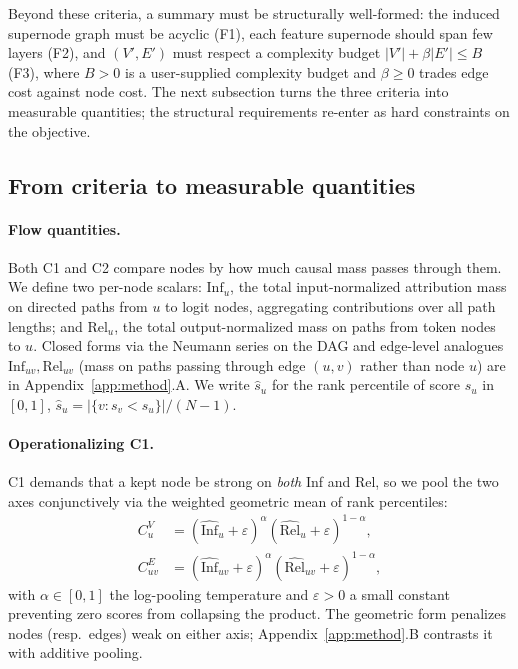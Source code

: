 \documentclass[table, 11pt]{article}
\begin{document}
Beyond these criteria, a summary must be structurally well-formed:
the induced supernode graph must be acyclic (F1), each feature
supernode should span few layers (F2), and $(V', E')$ must respect a
complexity budget $|V'| + \beta|E'| \le B$ (F3), where $B > 0$ is a
user-supplied complexity budget and $\beta \ge 0$ trades edge cost
against node cost. The next subsection turns the three criteria into
measurable quantities; the structural requirements re-enter as hard
constraints on the objective.

\subsection{From criteria to measurable quantities}\label{sec:operationalize}

\paragraph{Flow quantities.}
Both C1 and C2 compare nodes by how much causal mass passes through
them. We define two per-node scalars: $\text{Inf}_u$, the total
input-normalized attribution mass on directed paths from $u$ to
logit nodes, aggregating contributions over all path lengths; and
$\text{Rel}_u$, the total output-normalized mass on paths from
token nodes to $u$. Closed forms via the Neumann series on the DAG
and edge-level analogues $\text{Inf}_{uv}, \text{Rel}_{uv}$ (mass on
paths passing through edge $(u,v)$ rather than node $u$) are in
Appendix~\ref{app:method}.A. We write $\widehat{s}_u$ for the rank
percentile of score $s_u$ in $[0,1]$,
$\widehat{s}_u = |\{v : s_v < s_u\}|/(N - 1)$.

\paragraph{Operationalizing C1.}
C1 demands that a kept node be strong on \emph{both} Inf and Rel,
so we pool the two axes conjunctively via the weighted geometric
mean of rank percentiles:
\begin{align}
C^V_u    &= (\widehat{\text{Inf}}_u    + \varepsilon)^\alpha
            (\widehat{\text{Rel}}_u    + \varepsilon)^{1-\alpha},
            \label{eq:CV}\\
C^E_{uv} &= (\widehat{\text{Inf}}_{uv} + \varepsilon)^\alpha
            (\widehat{\text{Rel}}_{uv} + \varepsilon)^{1-\alpha},
            \label{eq:CE}
\end{align}
with $\alpha \in [0,1]$ the log-pooling temperature and
$\varepsilon > 0$ a small constant preventing zero scores from
collapsing the product. The geometric form penalizes nodes (resp.\
edges) weak on either axis; Appendix~\ref{app:method}.B contrasts it
with additive pooling.
\end{document}
